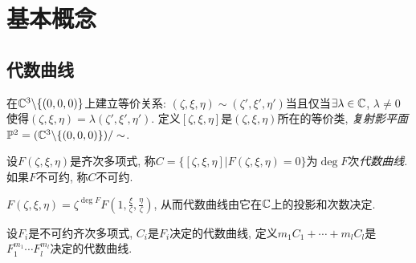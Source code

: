 \chapter{基本概念}\label{c1}
\section{代数曲线}\label{s1-1}
\begin{definition}
    在$\mathbb{C}^3\backslash\{(0,0,0)\}$上建立等价关系: $(\zeta,\xi,\eta)\sim(\zeta',\xi',\eta')$当且仅当$\exists\lambda\in\mathbb{C}$, $\lambda\neq0$使得$(\zeta,\xi,\eta)=\lambda(\zeta',\xi',\eta')$. 定义$[\zeta,\xi,\eta]$是$(\zeta,\xi,\eta)$所在的等价类, \textit{复射影平面}$\mathbb{P}^2=(\mathbb{C}^3\backslash\{(0,0,0)\})/\sim$. 
\end{definition}
\begin{definition}
    设$F(\zeta,\xi,\eta)$是齐次多项式, 称$C=\{[\zeta,\xi,\eta]|F(\zeta,\xi,\eta)=0\}$为$\deg F$次\textit{代数曲线}. 如果$F$不可约, 称$C$不可约. 
\end{definition}
\begin{remark}$F(\zeta,\xi,\eta)=\zeta^{\deg F}F(1,\frac\xi\zeta,\frac\eta\zeta)$, 从而代数曲线由它在$\mathbb{C}$上的投影和次数决定. 
\end{remark}
\begin{definition}
    设$F_i$是不可约齐次多项式, $C_i$是$F_i$决定的代数曲线, 定义$m_1C_1+\cdots+m_l C_l$是$F_1^{m_1}\cdots F_l^{m_l}$决定的代数曲线. 
\end{definition}

